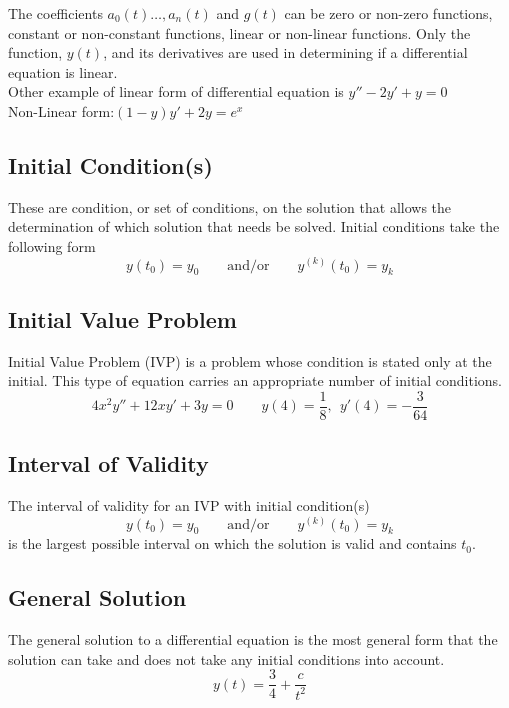 \documentclass[12pt]{report}
\newcommand{\sps}{\\[0.2cm]}
\newcommand{\NI}{\noindent}
\newcommand{\sprime}{'}
\newcommand{\dprime}{''}
\begin{document}
	\NI The coefficients $a_0(t)\ldots,a_n(t)$ and $g(t)$ can be zero or non-zero functions, constant or non-constant functions, linear or non-linear functions. Only the function, $y(t)$, and its derivatives are used in determining if a differential equation is linear.\sps
	
	\NI Other example of linear form of differential equation is $y\dprime - 2y\sprime + y = 0$\sps
	Non-Linear form:$(1-y)y\sprime + 2y = e^x$
	
	\subsection{Initial Condition(s)}
	These are condition, or set of conditions, on the solution that allows the determination of which solution that needs be solved. Initial conditions take the following form
	\begin{equation*}
		y(t_0) = y_0 \qquad \text{and/or}\qquad y^{(k)}(t_0) = y_k
	\end{equation*}
	
	
	\subsection{Initial Value Problem}
	Initial Value Problem (IVP) is a problem whose condition is stated only at the initial. This type of equation carries an appropriate number of initial conditions.
	\begin{equation}
		4x^2y\dprime + 12xy\sprime + 3y = 0 \qquad y(4) =\frac{1}{8}, ~~ y\sprime(4) = - \frac{3}{64}\label{eq:1_6}
	\end{equation}
	
	
	\subsection{Interval of Validity}
	The interval of validity for an IVP with initial condition(s)
	\begin{equation*}
		y(t_0) = y_0 \qquad \text{and/or}\qquad y^{(k)}(t_0) = y_k
	\end{equation*}
	is the largest possible interval on which the solution is valid and contains $t_0$.
	
	
	\subsection{General Solution}
	The general solution to a differential equation is the most general form that the solution can take and does not take any initial conditions into account.
	\begin{equation}
		y(t) = \frac{3}{4} + \frac{c}{t^2} \label{eq:1_7}
	\end{equation}
	
\end{document}
